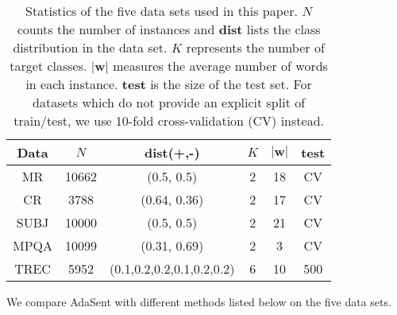 \documentclass{article}
\theoremstyle{definition}
\begin{document}
\begin{table}[htb]
\centering
\begin{tabular}{c||c|c|c|c|c}\hline
\textbf{Data} & $N$ & \textbf{dist}(+,-) & $K$ & $|\mathbf{w}|$ & \textbf{test}\\\hline
MR & 10662 & (0.5, 0.5) & 2 & 18 & CV \\
CR & 3788 & (0.64, 0.36) & 2 & 17 & CV \\
SUBJ & 10000 & (0.5, 0.5) & 2 & 21 & CV \\
MPQA & 10099 & (0.31, 0.69) & 2 & 3 & CV \\
TREC & 5952 & \footnotesize{(0.1,0.2,0.2,0.1,0.2,0.2)} & 6 & 10 & 500 \\\hline
\end{tabular}
\caption{Statistics of the five data sets used in this paper. $N$ counts the number of instances and \textbf{dist} lists the class distribution in the data set. $K$ represents the number of target classes. $|\mathbf{w}|$ measures the average number of words in each instance. \textbf{test} is the size of the test set. For datasets which do not provide an explicit split of train/test, we use 10-fold cross-validation (CV) instead.}
\label{table:dataset}
\end{table}
We compare AdaSent with different methods listed below on the five data sets.
\end{document}
